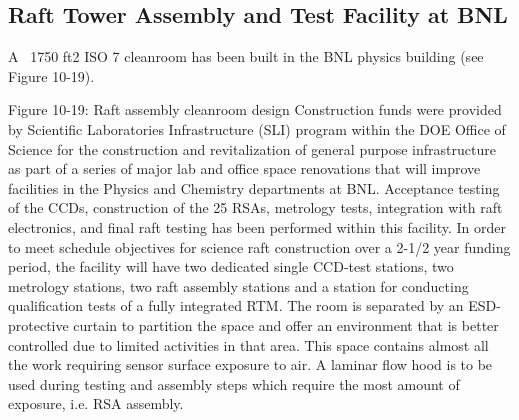 \subsection{Raft Tower Assembly and Test Facility at BNL}
A ~1750 ft2 ISO 7 cleanroom has been built in the BNL physics building (see Figure 10-19).
 
Figure 10-19: Raft assembly cleanroom design
 Construction funds were provided by Scientific Laboratories Infrastructure (SLI) program within the DOE Office of Science for the construction and revitalization of general purpose infrastructure as part of a series of major lab and office space renovations that will improve facilities in the Physics and Chemistry departments at BNL. 
Acceptance testing of the CCDs, construction of the 25 RSAs, metrology tests, integration with raft electronics, and final raft testing has been performed within this facility. In order to meet schedule objectives for science raft construction over a 2-1/2 year funding period, the facility will have two dedicated single CCD-test stations, two metrology stations, two raft assembly stations and a station for conducting qualification tests of a fully integrated RTM. The room is separated by an ESD-protective curtain to partition the space and offer an environment that is better controlled due to limited activities in that area. This space contains almost all the work requiring sensor surface exposure to air. A laminar flow hood is to be used during testing and assembly steps which require the most amount of exposure, i.e. RSA assembly. 

